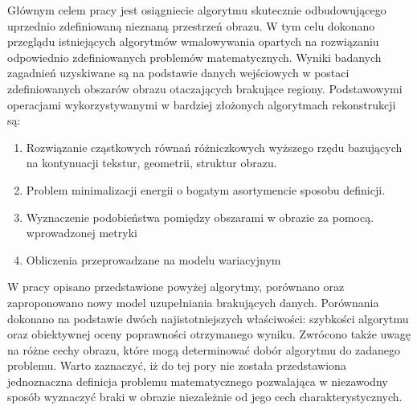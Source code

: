 \documentclass[12pt, twoside, openany]{report}
\theoremstyle{definition}
\begin{document}
\par
Głównym celem pracy jest osiągniecie algorytmu skutecznie odbudowującego uprzednio zdefiniowaną nieznaną przestrzeń obrazu. W tym celu dokonano przeglądu istniejących algorytmów wmalowywania opartych na rozwiązaniu odpowiednio zdefiniowanych problemów matematycznych. Wyniki badanych zagadnień uzyskiwane są na podstawie danych wejściowych w postaci zdefiniowanych obszarów obrazu otaczających brakujące regiony. Podstawowymi operacjami wykorzystywanymi w bardziej złożonych algorytmach rekonstrukcji są:
\begin{enumerate}
\item
Rozwiązanie cząstkowych równań różniczkowych wyższego rzędu bazujących na kontynuacji tekstur, geometrii, struktur obrazu.
\item
Problem minimalizacji energii o bogatym asortymencie sposobu definicji.
\item
Wyznaczenie podobieństwa pomiędzy obszarami w obrazie za pomocą. wprowadzonej metryki 
\item
Obliczenia przeprowadzane na modelu wariacyjnym
\end{enumerate}
\par
W pracy opisano przedstawione powyżej algorytmy, porównano oraz zaproponowano nowy model uzupełniania brakujących danych. Porównania dokonano na podstawie dwóch najistotniejszych właściwości: szybkości algorytmu oraz obiektywnej oceny poprawności otrzymanego wyniku. Zwrócono także uwagę na różne cechy obrazu, które mogą determinować dobór algorytmu do zadanego problemu. Warto zaznaczyć, iż do tej pory nie została przedstawiona jednoznaczna definicja problemu matematycznego pozwalająca w niezawodny sposób wyznaczyć braki w obrazie niezależnie od jego cech charakterystycznych.
\end{document}
